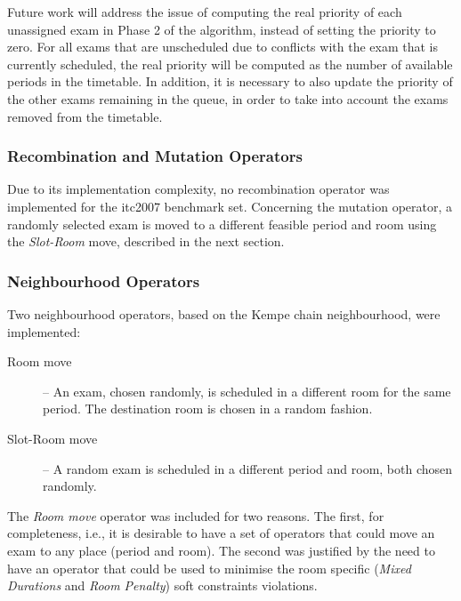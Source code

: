 Future work will address the issue of computing the real priority of each unassigned exam in Phase 2 of the algorithm, instead of setting the priority to zero. For all exams that are unscheduled due to conflicts with the exam that is currently scheduled, the real priority will be computed as the number of available periods in the timetable. In addition, it is necessary to also update the priority of the other exams remaining in the queue, in order to take into account the exams removed from the timetable.



\subsubsection{Recombination and Mutation Operators}
\label{sec:RecombinationMutationOperatorITC2007}

Due to its implementation complexity, no recombination operator was implemented for the \gls{itc2007} benchmark set. Concerning the mutation operator, a randomly selected exam is moved to a different feasible period and room using the \textit{Slot-Room} move, described in the next section.



\subsubsection{Neighbourhood Operators}
\label{sec:neighbourhoodOperatorITC2007}

Two neighbourhood operators, based on the Kempe chain neighbourhood, were implemented:
\begin{description}
	\item[Room move] -- An exam, chosen randomly, is scheduled in a different room for the same period. The destination room is chosen in a random fashion.
	
	\item[Slot-Room move] -- A random exam is scheduled in a different period and room, both chosen randomly.
\end{description}


The \textit{Room move} operator was included for two reasons. The first, for completeness, i.e., it is desirable to have a set of operators that could move an exam to any place (period and room). The second was justified by the need to have an operator that could be used to minimise the room specific (\textit{Mixed Durations} and \textit{Room Penalty}) soft constraints violations.

